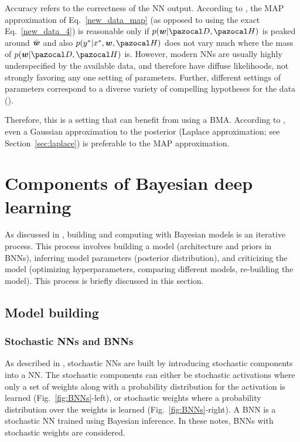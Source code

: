 Accuracy refers to the correctness of the NN output.
According to \textcite{wilson2020bayesian}, the MAP approximation of Eq.~\eqref{new_data_map} (as opposed to using the exact Eq.~\eqref{new_data_4}) is reasonable only if $p(\bw|\cD,\cH)$ is peaked around $\hat{\boldsymbol{w}}$ and also $p(y^*|x^*, \bw, \cH)$ does not vary much where the mass of $p(\bw|\cD,\cH)$ is. 
However, modern NNs are usually highly underspecified by the available data, and therefore have diffuse likelihoods, not strongly favoring any one setting of parameters.
Further, different settings of parameters correspond to a diverse variety of compelling hypotheses for the data (\cite{garipov2018loss}). 

Therefore, this is a setting that can benefit from using a BMA. 
According to \textcite{wilson2020bayesian}, even a Gaussian approximation to the posterior (Laplace approximation; see Section~\ref{sec:laplace}) is preferable to the MAP approximation. 

\section{Components of Bayesian deep learning}\label{sec:components}

As discussed in \textcite{blei2014build}, building and computing with Bayesian models is an iterative process. 
This process involves building a model (architecture and priors in BNNs), inferring model parameters (posterior distribution), and criticizing the model (optimizing hyperparameters, comparing different models, re-building the model).
This process is briefly discussed in this section.

\subsection{Model building}

\subsubsection{Stochastic NNs and BNNs}\label{sec:stochastic_NNs}
As described in \textcite{jospin2020handson}, stochastic NNs are built by introducing stochastic components into a NN. 
The stochastic components can either be stochastic activations  where only a set of weights along with a probability distribution for the activation is learned (Fig.~\ref{fig:BNNs}-left), or stochastic weights where a probability distribution over the weights is learned (Fig.~\ref{fig:BNNs}-right).
A BNN is a stochastic NN trained using Bayesian inference.
In these notes, BNNs with stochastic weights are considered. 

